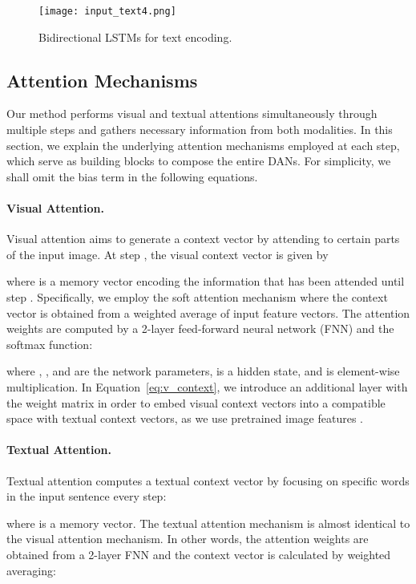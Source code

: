\documentclass[10pt,twocolumn,letterpaper]{article}
\begin{document}
\begin{figure}[t]
\begin{center}
\texttt{[image: input\_text4.png]}
\caption{
Bidirectional LSTMs for text encoding.
}
\label{fig:input_text}
\vspace{-5mm}
\end{center}
\end{figure}

\subsection{Attention Mechanisms}
\label{sub:attention}
Our method performs visual and textual attentions simultaneously through multiple steps and gathers necessary information from both modalities.
In this section, we explain the underlying attention mechanisms employed at each step, which serve as building blocks to compose the entire DANs.
For simplicity, we shall omit the bias term  in the following equations.

\paragraph{Visual Attention.}
Visual attention aims to generate a context vector by attending to certain parts of the input image.
At step , the visual context vector  is given by

where  is a memory vector encoding the information that has been attended until step .
Specifically, we employ the soft attention mechanism where the context vector is obtained from a weighted average of input feature vectors.
The attention weights  are computed by a 2-layer feed-forward neural network (FNN) and the softmax function:

where , , and  are the network parameters,  is a hidden state, and  is element-wise multiplication.
In Equation~\ref{eq:v_context}, we introduce an additional layer with the weight matrix  in order to embed visual context vectors into a compatible space with textual context vectors, as we use pretrained image features .

\paragraph{Textual Attention.}
Textual attention computes a textual context vector  by focusing on specific words in the input sentence every step:

where  is a memory vector.
The textual attention mechanism is almost identical to the visual attention mechanism.
In other words, the attention weights  are obtained from a 2-layer FNN and the context vector  is calculated by weighted averaging:
\end{document}
